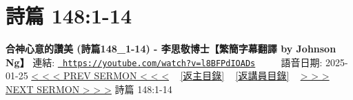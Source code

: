 \documentclass{book}
\begin{document}
\section{詩篇 148:1-14}
\label{sec:l8BFPdIOADs}
\textbf{合神心意的讚美 (詩篇148\_1-14) - 李思敬博士【繁簡字幕翻譯 by Johnson Ng】}
\newline
\newline
連結: \href{https://youtube.com/watch?v=l8BFPdIOADs}{\texttt{ https://youtube.com/watch?v=l8BFPdIOADs}} ~~~~ 語音日期: 2025-01-25 
\newline
\newline
\hyperref[sec:YdX9gstJs1g]{< < < PREV SERMON < < <}
~
\hyperlink{toc}{[返主目錄]}
~
\hyperref[ch:preacher5]{[返講員目錄]}
~
\hyperref[sec:fJrsPMmDHtU]{> > > NEXT SERMON > > >}
\newline
\newline
詩篇 148:1-14
\newline
\end{document}
